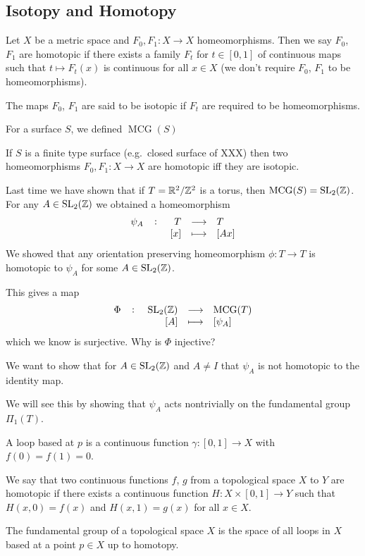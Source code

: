 \documentclass[11pt,a4paper]{article}
\DeclareMathOperator{\MCG}{MCG}
\begin{document}
\subsection{Isotopy and Homotopy}
Let $X$ be a metric space and $F_0, F_1 \colon X \to X$ homeomorphisms.
Then we say $F_0$, $F_1$ are homotopic if there exists a family $F_t$
for $t \in [0,1]$ of continuous maps such that $t \mapsto F_t(x)$ is
continuous for all $x \in X$ (we don't require $F_0$, $F_1$ to be 
homeomorphisms).

The maps $F_0$, $F_1$ are said to be isotopic if $F_t$ are required to
be homeomorphisms.

For a surface $S$, we defined $\MCG(S)$

\begin{theorem}
  If $S$ is a finite type surface (e.g.\ closed surface of XXX)
  then two homeomorphisms $F_0, F_1 \colon X \to X$ are homotopic
  iff they are isotopic.
\end{theorem}

Last time we have shown that if $T = \mathbb{R}^2 / \mathbb{Z}^2$ is a torus,
then $\MCG(S) = \SL_2(\Z)$.
For any $A \in \mathrm{SL}_2(\mathbb{Z})$ we obtained a homeomorphism
\[
  \fullfunction{\psi_A}{T}{T}{[x]}{[Ax]}
\]
We showed that any orientation preserving homeomorphism $\phi \colon T \to T$
is homotopic to $\psi_A$ for some $A \in \mathrm{SL}_2(\mathbb{Z})$.

This gives a map
\[
  \fullfunction{\Phi}{\SL_2(\Z)}{\MCG(T)}{[A]}{[\psi_A]}
\]
which we know is surjective.
Why is $\Phi$ injective?


We want to show that for $A \in \mathrm{SL}_2(\mathbb{Z})$ and $A \neq I$ that $\psi_A$
is not homotopic to the identity map.

We will see this by showing that $\psi_A$ acts nontrivially on the fundamental
group $\Pi_1(T)$.

\begin{definition}[Loop]
  A loop based at $p$ is a continuous function $\gamma \colon [0,1] \to X$ with 
  $f(0) = f(1) = 0$.
\end{definition}

\begin{definition}[Homotopy]
  We say that two continuous functions $f$, $g$ from a topological space $X$
  to $Y$ are homotopic if there exists a continuous function 
  $H \colon X \times [0,1] \to Y$ such that $H(x,0) = f(x)$ and
  $H(x,1) = g(x)$ for all $x \in X$.
\end{definition}

\begin{definition}
  The fundamental group of a topological space $X$ is the space of all loops
  in $X$ based at a point $p \in X$ up to homotopy.
\end{definition}
 
\end{document}
